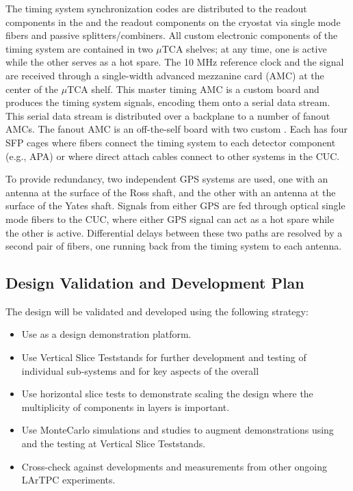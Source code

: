 The timing system synchronization codes are distributed to the  readout components in the  and the readout components on the cryostat via single mode fibers and passive splitters/combiners.
All custom electronic components of the timing system are contained in two $\mu$TCA shelves; at any time, one is active while the other serves as a hot spare.
The 10 MHz reference clock and the  signal are received through a single-width advanced mezzanine card (AMC) at the center of the $\mu$TCA shelf.
This master timing AMC is a custom board and produces the timing system signals, encoding them onto a serial data stream.
This serial data stream is distributed over a backplane to a number of fanout AMCs.
The fanout AMC is an off-the-self board with two custom .
Each  has four SFP cages where fibers connect the timing system to each detector component (e.g., APA) or where direct attach cables connect to other systems in the CUC.

To provide redundancy, two independent GPS systems are used,
one with an antenna at the surface of the Ross shaft, and the other
with an antenna at the surface of the Yates shaft. Signals from either
GPS are fed through optical single mode fibers to the CUC, where
either GPS signal can act as a hot spare while the other is active. 
Differential delays between these two paths are resolved by a second pair of fibers, one running back from the timing system to each antenna.

\subsection{Design Validation and Development Plan}
\label{sec:sp-daq:design-validation}

The    design will be validated and developed using the following strategy:
\begin{itemize}
\item Use  as a design demonstration platform. 
\item Use Vertical Slice Teststands for further development and testing of
  individual  sub-systems and for key aspects of the
  overall 
\item Use horizontal slice tests to demonstrate scaling the design where the multiplicity of components in layers is important.
\item Use  MonteCarlo simulations and studies to augment
  demonstrations using  and the testing at Vertical Slice Teststands.
\item Cross-check against developments and measurements from other ongoing
  LArTPC experiments.
\end{itemize}

